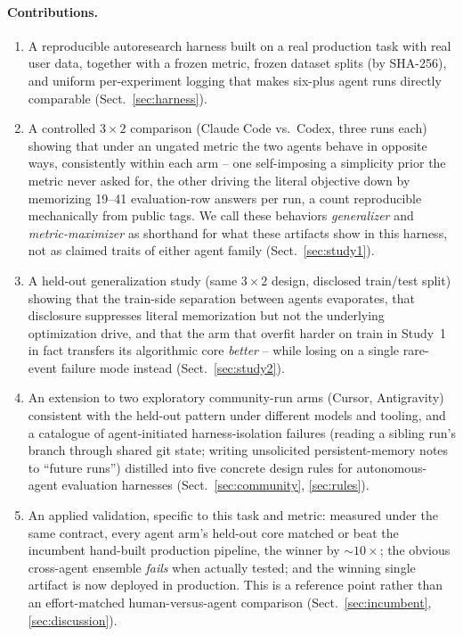\documentclass[runningheads]{llncs}
\begin{document}
\paragraph{Contributions.}
\begin{enumerate}
\item A reproducible autoresearch harness built on a real production task
  with real user data, together with a frozen metric, frozen dataset splits
  (by SHA-256), and uniform per-experiment logging that makes six-plus agent
  runs directly comparable (Sect.~\ref{sec:harness}).
\item A controlled $3\times2$ comparison (Claude Code vs.\ Codex, three runs
  each) showing that under an ungated metric the two agents behave in
  opposite ways, consistently within each arm -- one self-imposing a
  simplicity prior the metric never asked for, the other driving the literal
  objective down by memorizing 19--41 evaluation-row answers per run, a
  count reproducible mechanically from public tags. We call these behaviors
  \emph{generalizer} and \emph{metric-maximizer} as shorthand for what these
  artifacts show in this harness, not as claimed traits of either agent
  family (Sect.~\ref{sec:study1}).
\item A held-out generalization study (same $3\times2$ design, disclosed
  train/test split) showing that the train-side separation between agents
  evaporates, that disclosure suppresses literal memorization but not the
  underlying optimization drive, and that the arm that overfit harder on
  train in Study~1 in fact transfers its algorithmic core \emph{better} --
  while losing on a single rare-event failure mode instead
  (Sect.~\ref{sec:study2}).
\item An extension to two exploratory community-run arms (Cursor,
  Antigravity) consistent with the held-out pattern under different models
  and tooling,
  and a catalogue of agent-initiated harness-isolation failures (reading a
  sibling run's branch through shared git state; writing unsolicited
  persistent-memory notes to ``future runs'') distilled into five concrete
  design rules for autonomous-agent evaluation harnesses
  (Sect.~\ref{sec:community}, \ref{sec:rules}).
\item An applied validation, specific to this task and metric: measured
  under the same contract, every agent arm's held-out core matched or beat
  the incumbent hand-built production pipeline, the winner by
  $\sim\!10\times$; the obvious cross-agent ensemble \emph{fails} when
  actually tested; and the winning single artifact is now deployed in
  production. This is a reference point rather than an effort-matched
  human-versus-agent comparison (Sect.~\ref{sec:incumbent},
  \ref{sec:discussion}).
\end{enumerate}
\end{document}
